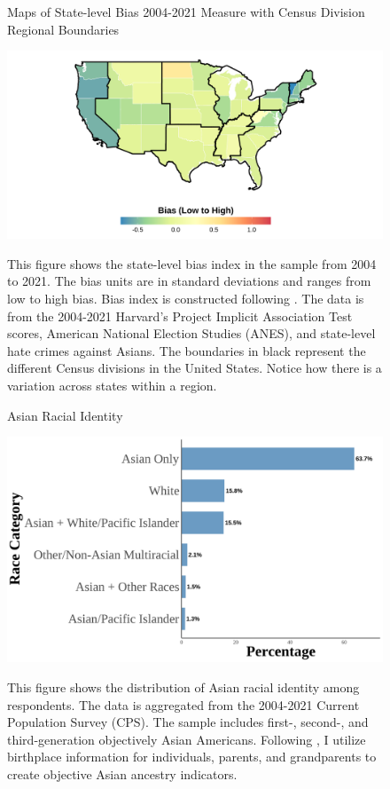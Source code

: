 \begin{center}
\begin{figure}[H]
\caption{Maps of State-level Bias 2004-2021 Measure with Census Division Regional Boundaries}
\includegraphics[width=\textwidth]{Average_Skinmap.png} 
\label{fig:iat-map-all}
\caption*{\footnotesize{This figure shows the state-level bias index in the sample from 2004 to 2021. The bias units are in standard deviations and ranges from low to high bias. Bias index is constructed following \textcite{lubotskyInterpretationRegressionsMultiple2006}. The data is from the 2004-2021 Harvard's Project Implicit Association Test scores, American National Election Studies (ANES), and state-level hate crimes against Asians. The boundaries in black represent the different Census divisions in the United States. Notice how there is a variation across states within a region.}}
\end{figure}
\end{center}

\newpage
\pagebreak

\begin{center}
\begin{figure}[H]
\caption{Asian Racial Identity}
\includegraphics[width=\textwidth]{histogram_asian_american_race_aggregated.png} 
\label{fig:histogram-all}
\caption*{\footnotesize{This figure shows the distribution of Asian racial identity among respondents. 
The data is aggregated from the 2004-2021 Current Population Survey (CPS). 
The sample includes first-, second-, and third-generation objectively Asian Americans.
Following \textcite{antmanEthnicAttritionObserved2016,antmanEthnicAttritionAssimilation2020}, 
I utilize birthplace information for individuals, parents, and grandparents to create objective Asian ancestry indicators.
}}
\end{figure}
\end{center}

